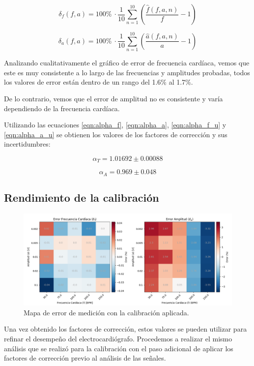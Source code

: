 \documentclass[conference]{IEEEtran}
\begin{document}
$$ \delta_{f} \left(f, a\right) = 100 \% ~ \cdot \dfrac{1}{10} \sum_{n=1}^{10}
\left( \dfrac{\hat{f}(f,a,n)}{f} - 1\right)$$
 

$$ \delta_{a} \left(f, a\right) = 100 \% ~ \cdot \dfrac{1}{10} \sum_{n=1}^{10}
\left( \dfrac{\hat{a}(f,a,n)}{a} - 1\right)$$


Analizando cualitativamente el gráfico de error de frecuencia cardíaca, vemos
que este es muy consistente a lo largo de las frecuencias y amplitudes probadas,
todos los valores de error están dentro de un rango del 1.6\% al 1.7\%.

De lo contrario, vemos que el error de amplitud no es consistente y varía
dependiendo de la frecuencia cardíaca.

Utilizando las ecuaciones \ref{eqn:alpha_f}, \ref{eqn:alpha_a},
\ref{eqn:alpha_f_u} y \ref{eqn:alpha_a_u} se obtienen los valores de los
factores de corrección y sus incertidumbres:

\boldmath
$$ \alpha_{T} = 1.01692 \pm 0.00088 $$

$$ \alpha_{A} = 0.969 \pm 0.048 $$
\unboldmath  

\subsection{Rendimiento de la calibración}

\begin{figure}[t]
    \centering
    \includegraphics[width=\textwidth]{figs/test_error_map.png}
    \caption{Mapa de error de medición con la calibración aplicada.}
    \label{fig:plot_errpr_con_calib}

\end{figure}

Una vez obtenido los factores de corrección, estos valores se pueden utilizar
para refinar el desempeño del electrocardiógrafo. Procedemos a
realizar el mismo análisis que se realizó para la calibración con el paso
adicional de aplicar los factores de corrección previo al análisis de las
señales.
\end{document}
